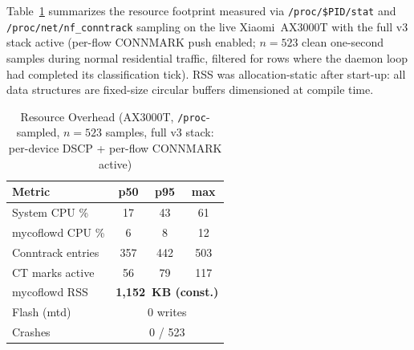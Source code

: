 \documentclass[conference]{IEEEtran}
\begin{document}
Table~\ref{tab:resources} summarizes the resource footprint measured via
\texttt{/proc/\$PID/stat} and \texttt{/proc/net/nf\_conntrack} sampling
on the live Xiaomi~AX3000T with the full v3 stack active
(per-flow CONNMARK push enabled; $n{=}523$ clean one-second samples
during normal residential traffic, filtered for rows where the daemon
loop had completed its classification tick).
RSS was allocation-static after start-up: all data structures are
fixed-size circular buffers dimensioned at compile time.

\begin{table}[t]
\caption{Resource Overhead (AX3000T, \texttt{/proc}-sampled, $n{=}523$ samples,
         full v3 stack: per-device DSCP + per-flow CONNMARK active)}
\label{tab:resources}
\centering
\scriptsize
{\setlength{\tabcolsep}{4pt}
\begin{tabular}{l|ccc}
\toprule
\textbf{Metric} & \textbf{p50} & \textbf{p95} & \textbf{max} \\
\midrule
System CPU \%        & 17 & 43 & 61  \\
mycoflowd CPU \%     & 6  & 8  & 12  \\
Conntrack entries    & 357 & 442 & 503 \\
CT marks active      & 56  & 79  & 117 \\
\midrule
mycoflowd RSS        & \multicolumn{3}{c}{\textbf{1{,}152~KB (const.)}} \\
Flash (mtd)          & \multicolumn{3}{c}{0 writes} \\
Crashes              & \multicolumn{3}{c}{0 / 523} \\
\bottomrule
\end{tabular}}
\end{table}
\end{document}
